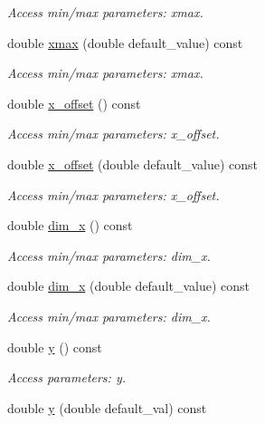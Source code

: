 \begin{DoxyCompactItemize}
\begin{DoxyCompactList}\small\item\em Access min/max parameters\+: xmax. \end{DoxyCompactList}\item 
double \hyperlink{struct_d_d4hep_1_1_x_m_l_1_1_dimension_a082d503b8d74d862160484901720a212}{xmax} (double default\+\_\+value) const
\begin{DoxyCompactList}\small\item\em Access min/max parameters\+: xmax. \end{DoxyCompactList}\item 
double \hyperlink{struct_d_d4hep_1_1_x_m_l_1_1_dimension_a9356efb69b92e1e6fab987b6f7d3ebc0}{x\+\_\+offset} () const
\begin{DoxyCompactList}\small\item\em Access min/max parameters\+: x\+\_\+offset. \end{DoxyCompactList}\item 
double \hyperlink{struct_d_d4hep_1_1_x_m_l_1_1_dimension_aecadb2c6b0fa885ad1eaab2ff0c7228b}{x\+\_\+offset} (double default\+\_\+value) const
\begin{DoxyCompactList}\small\item\em Access min/max parameters\+: x\+\_\+offset. \end{DoxyCompactList}\item 
double \hyperlink{struct_d_d4hep_1_1_x_m_l_1_1_dimension_afac2d2f56929e6d5445128529ab14bb1}{dim\+\_\+x} () const
\begin{DoxyCompactList}\small\item\em Access min/max parameters\+: dim\+\_\+x. \end{DoxyCompactList}\item 
double \hyperlink{struct_d_d4hep_1_1_x_m_l_1_1_dimension_a54a0c2165c23d4c9b936d62ce150f569}{dim\+\_\+x} (double default\+\_\+value) const
\begin{DoxyCompactList}\small\item\em Access min/max parameters\+: dim\+\_\+x. \end{DoxyCompactList}\item 
double \hyperlink{struct_d_d4hep_1_1_x_m_l_1_1_dimension_a95de608bea42c9e3a235d4fbaf3ae3ae}{y} () const
\begin{DoxyCompactList}\small\item\em Access parameters\+: y. \end{DoxyCompactList}\item 
double \hyperlink{struct_d_d4hep_1_1_x_m_l_1_1_dimension_a267bde8c0a47b0b56aa4ff18b2f2f6b5}{y} (double default\+\_\+val) const

\end{DoxyCompactItemize}
